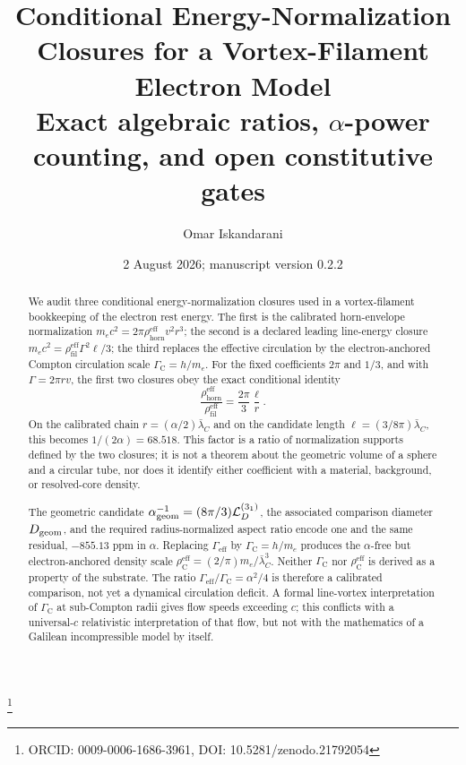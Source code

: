\documentclass[aps,pre,preprint,notitlepage,nofootinbib,superscriptaddress]{revtex4-2}
\newcommand{\rhohorn}{\rho_{\mathrm{horn}}^{\mathrm{eff}}}
\newcommand{\rhofil}{\rho_{\mathrm{fil}}^{\mathrm{eff}}}
\newcommand{\rhoCeff}{\rho_{\mathrm C}^{\mathrm{eff}}}
\newcommand{\Gammaeff}{\Gamma_{\mathrm{eff}}}
\newcommand{\GammaC}{\Gamma_{\mathrm C}}
\begin{document}
\title{\texorpdfstring{Conditional Energy-Normalization Closures for a Vortex-Filament Electron Model\\\large Exact algebraic ratios, \(\alpha\)-power counting, and open constitutive gates}{Conditional Energy-Normalization Closures for a Vortex-Filament Electron Model}}

\author{Omar Iskandarani}
\thanks{ORCID: 0009-0006-1686-3961, DOI: 10.5281/zenodo.21792054 }
\date{2 August 2026; manuscript version 0.2.2}

\begin{abstract}
We audit three conditional energy-normalization closures used in a vortex-filament bookkeeping of the electron rest energy.  The first is the calibrated horn-envelope normalization
\(m_ec^2=2\pi\rhohorn v^2r^3\); the second is a declared leading line-energy closure
\(m_ec^2=\rhofil\Gamma^2\ell/3\); the third replaces the effective circulation by the electron-anchored Compton circulation scale \(\GammaC=h/m_e\).
For the fixed coefficients \(2\pi\) and \(1/3\), and with \(\Gamma=2\pi rv\), the first two closures obey the exact conditional identity
\[
\frac{\rhohorn}{\rhofil}
=\frac{2\pi}{3}\frac{\ell}{r}.
\]
On the calibrated chain \(r=(\alpha/2)\bar\lambda_C\) and on the candidate length
\(\ell=(3/8\pi)\bar\lambda_C\), this becomes \(1/(2\alpha)=68.518\).
This factor is a ratio of normalization supports defined by the two closures; it is not a theorem about the geometric volume of a sphere and a circular tube, nor does it identify either coefficient with a material, background, or resolved-core density.

The geometric candidate
\(\alpha_{\rm geom}^{-1}=(8\pi/3)\mathcal L_D^{(3_1)}\), the associated comparison diameter \(D_{\rm geom}\), and the required radius-normalized aspect ratio encode one and the same residual, \(-855.13\) ppm in \(\alpha\).
Replacing \(\Gammaeff\) by \(\GammaC=h/m_e\) produces the \(\alpha\)-free but electron-anchored density scale
\(\rhoCeff=(2/\pi)m_e/\bar\lambda_C^3\).
Neither \(\GammaC\) nor \(\rhoCeff\) is derived as a property of the substrate.
The ratio \(\Gammaeff/\GammaC=\alpha^2/4\) is therefore a calibrated comparison, not yet a dynamical circulation deficit.
A formal line-vortex interpretation of \(\GammaC\) at sub-Compton radii gives flow speeds exceeding \(c\); this conflicts with a universal-\(c\) relativistic interpretation of that flow, but not with the mathematics of a Galilean incompressible model by itself.


\end{abstract}
\end{document}
